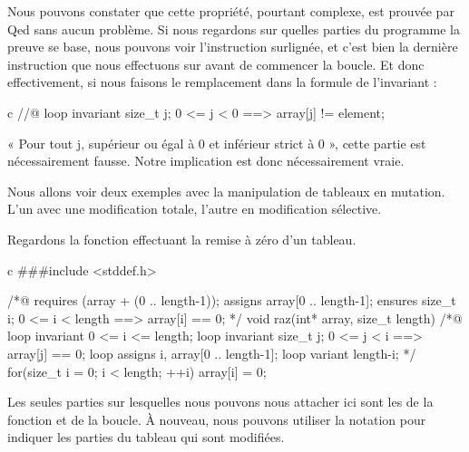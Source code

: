 \documentclass[middle]{zmdocument}
\begin{document}
Nous pouvons constater que cette propriété, pourtant complexe, est prouvée par 
Qed sans aucun problème. Si nous regardons sur quelles parties du programme la 
preuve se base, nous pouvons voir l'instruction  surlignée, et c'est 
bien la dernière instruction que nous effectuons sur  avant de commencer
la boucle. Et donc effectivement, si nous faisons le remplacement dans la formule 
de l'invariant :



\begin{CodeBlock}{c}
//@ loop invariant \forall size_t j; 0 <= j < 0 ==> array[j] != element;
\end{CodeBlock}



« Pour tout j, supérieur ou égal à 0 et inférieur strict à 0 », cette partie est
nécessairement fausse. Notre implication est donc nécessairement vraie.





Nous allons voir deux exemples avec la manipulation de tableaux en mutation. 
L'un avec une modification totale, l'autre en modification sélective.





Regardons la fonction effectuant la remise à zéro d'un tableau.



\begin{CodeBlock}{c}
###include <stddef.h>

/*@
  requires \valid(array + (0 .. length-1));
  assigns  array[0 .. length-1];
  ensures  \forall size_t i; 0 <= i < length ==> array[i] == 0;
*/
void raz(int* array, size_t length){
  /*@
    loop invariant 0 <= i <= length;
    loop invariant \forall size_t j; 0 <= j < i ==> array[j] == 0;
    loop assigns i, array[0 .. length-1];
    loop variant length-i;
  */
  for(size_t i = 0; i < length; ++i)
    array[i] = 0;
}
\end{CodeBlock}



Les seules parties sur lesquelles nous pouvons nous attacher ici sont 
les  de la fonction et de la boucle. À nouveau, nous pouvons
utiliser la notation  pour indiquer les parties du tableau 
qui sont modifiées.



\end{document}
